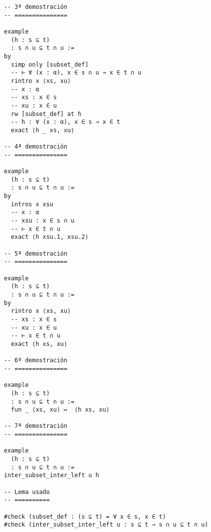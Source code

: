 \begin{verbatim}
-- 3ª demostración
-- ===============

example
  (h : s ⊆ t)
  : s ∩ u ⊆ t ∩ u :=
by
  simp only [subset_def]
  -- ⊢ ∀ (x : α), x ∈ s ∩ u → x ∈ t ∩ u
  rintro x ⟨xs, xu⟩
  -- x : α
  -- xs : x ∈ s
  -- xu : x ∈ u
  rw [subset_def] at h
  -- h : ∀ (x : α), x ∈ s → x ∈ t
  exact ⟨h _ xs, xu⟩

-- 4ª demostración
-- ===============

example
  (h : s ⊆ t)
  : s ∩ u ⊆ t ∩ u :=
by
  intros x xsu
  -- x : α
  -- xsu : x ∈ s ∩ u
  -- ⊢ x ∈ t ∩ u
  exact ⟨h xsu.1, xsu.2⟩

-- 5ª demostración
-- ===============

example
  (h : s ⊆ t)
  : s ∩ u ⊆ t ∩ u :=
by
  rintro x ⟨xs, xu⟩
  -- xs : x ∈ s
  -- xu : x ∈ u
  -- ⊢ x ∈ t ∩ u
  exact ⟨h xs, xu⟩

-- 6ª demostración
-- ===============

example
  (h : s ⊆ t)
  : s ∩ u ⊆ t ∩ u :=
  fun _ ⟨xs, xu⟩ ↦  ⟨h xs, xu⟩

-- 7ª demostración
-- ===============

example
  (h : s ⊆ t)
  : s ∩ u ⊆ t ∩ u :=
inter_subset_inter_left u h

-- Lema usado
-- ==========

#check (subset_def : (s ⊆ t) = ∀ x ∈ s, x ∈ t)
#check (inter_subset_inter_left u : s ⊆ t → s ∩ u ⊆ t ∩ u)
\end{verbatim}

